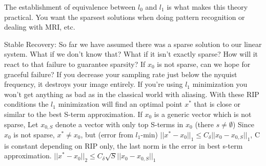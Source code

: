 \documentclass[12pt,letterpaper]{report}
\begin{document}
The establishment of equivalence between $l_0$ and $l_1$ is what makes this theory practical.  You want the sparsest solutions when doing pattern recognition or dealing with MRI, etc.

Stable Recovery: So far we have assumed there was a sparse solution to our linear system.  What if we don't know that?  What if it isn't exactly sparse?  How will it react to that failure to guarantee sparsity?  If $x_0$ is not sparse, can we hope for graceful failure?  If you decrease your sampling rate just below the nyquist frequency, it destroys your image entirely.  If you're using $l_1$ minimization you won't get anything as bad as in the classical world with aliasing.  With these RIP conditions the $l_1$ minimization will find an optimal point $x^*$ that is close or similar to the best S-term approximation.  If $x_0$ is a generic vector which is not sparse, Let $x_{0,S}$ denote a vector with only top S-terms in $x_0$ (there $s \neq \emptyset$)  Since $x_0$ is not sparse, $x^* \neq	 x_0$, but (error from $l_1$-min) $||x^* - x_0||_1 \leq C_\delta ||x_0 - x_{0,S}||_1$, C is constant depending on RIP only, the last norm is the error in best s-term approximation.  $||x^* - x_0||_2 \leq C_\delta \sqrt{S}||x_0 - x_{0,S}||_1$
\end{document}
